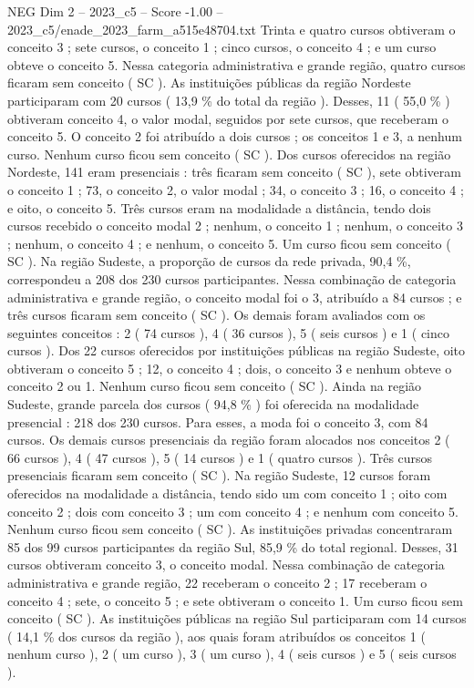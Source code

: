 \begin{textsample}{NEG Dim 2 – 2023\_c5 – Score -1.00 – 2023\_c5/enade\_2023\_farm\_a515e48704.txt}
Trinta e quatro cursos obtiveram o conceito 3 ; sete cursos, o conceito 1 ; cinco cursos, o conceito 4 ; e um curso obteve o conceito 5.
Nessa categoria administrativa e grande região, quatro cursos ficaram sem conceito ( SC ).
As instituições públicas da região Nordeste participaram com 20 cursos ( 13,9 \% do total da região ).
Desses, 11 ( 55,0 \% ) obtiveram conceito 4, o valor modal, seguidos por sete cursos, que receberam o conceito 5.
O conceito 2 foi atribuído a dois cursos ; os conceitos 1 e 3, a nenhum curso.
Nenhum curso ficou sem conceito ( SC ).
Dos cursos oferecidos na região Nordeste, 141 eram presenciais : três ficaram sem conceito ( SC ), sete obtiveram o conceito 1 ; 73, o conceito 2, o valor modal ; 34, o conceito 3 ; 16, o conceito 4 ; e oito, o conceito 5.
Três cursos eram na modalidade a distância, tendo dois cursos recebido o conceito modal 2 ; nenhum, o conceito 1 ; nenhum, o conceito 3 ; nenhum, o conceito 4 ; e nenhum, o conceito 5.
Um curso ficou sem conceito ( SC ).
Na região Sudeste, a proporção de cursos da rede privada, 90,4 \%, correspondeu a 208 dos 230 cursos participantes.
Nessa combinação de categoria administrativa e grande região, o conceito modal foi o 3, atribuído a 84 cursos ; e três cursos ficaram sem conceito ( SC ).
Os demais foram avaliados com os seguintes conceitos : 2 ( 74 cursos ), 4 ( 36 cursos ), 5 ( seis cursos ) e 1 ( cinco cursos ).
Dos 22 cursos oferecidos por instituições públicas na região Sudeste, oito obtiveram o conceito 5 ; 12, o conceito 4 ; dois, o conceito 3 e nenhum obteve o conceito 2 ou 1.
Nenhum curso ficou sem conceito ( SC ).
Ainda na região Sudeste, grande parcela dos cursos ( 94,8 \% ) foi oferecida na modalidade presencial : 218 dos 230 cursos.
Para esses, a moda foi o conceito 3, com 84 cursos.
Os demais cursos presenciais da região foram alocados nos conceitos 2 ( 66 cursos ), 4 ( 47 cursos ), 5 ( 14 cursos ) e 1 ( quatro cursos ).
Três cursos presenciais ficaram sem conceito ( SC ).
Na região Sudeste, 12 cursos foram oferecidos na modalidade a distância, tendo sido um com conceito 1 ; oito com conceito 2 ; dois com conceito 3 ; um com conceito 4 ; e nenhum com conceito 5.
Nenhum curso ficou sem conceito ( SC ).
As instituições privadas concentraram 85 dos 99 cursos participantes da região Sul, 85,9 \% do total regional.
Desses, 31 cursos obtiveram conceito 3, o conceito modal.
Nessa combinação de categoria administrativa e grande região, 22 receberam o conceito 2 ; 17 receberam o conceito 4 ; sete, o conceito 5 ; e sete obtiveram o conceito 1.
Um curso ficou sem conceito ( SC ).
As instituições públicas na região Sul participaram com 14 cursos ( 14,1 \% dos cursos da região ), aos quais foram atribuídos os conceitos 1 ( nenhum curso ), 2 ( um curso ), 3 ( um curso ), 4 ( seis cursos ) e 5 ( seis cursos ).

\end{textsample}
